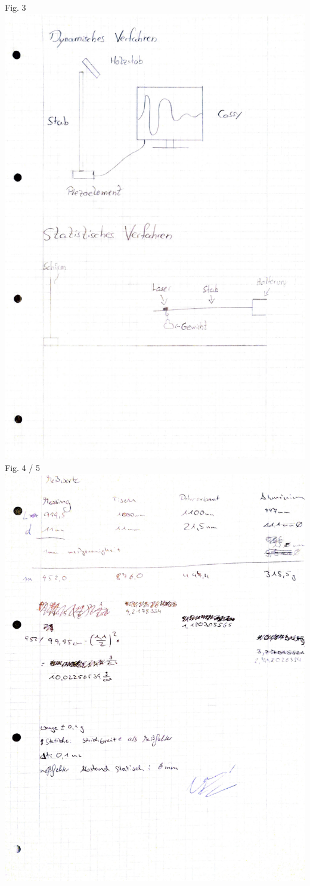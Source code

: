 \documentclass[11pt, a4paper]{article}
\begin{document}
Fig. 3\\
\includegraphics[scale=0.7]{fig45.pdf}\\
Fig. 4 / 5\\
\includegraphics[scale=0.7]{Messdaten.pdf}\\
\end{document}
